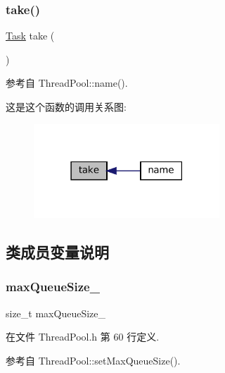\subsubsection{\texorpdfstring{take()}{take()}}
{\footnotesize\ttfamily \hyperlink{classmuduo_1_1ThreadPool_a46c264006febdf6c5dae5921d59c18d2}{Task} take (\begin{DoxyParamCaption}{ }\end{DoxyParamCaption})\hspace{0.3cm}{\ttfamily [private]}}



参考自 Thread\+Pool\+::name().

这是这个函数的调用关系图\+:
\nopagebreak
\begin{figure}[H]
\begin{center}
\leavevmode
\includegraphics[width=198pt]{classmuduo_1_1ThreadPool_a3a83b91742d92c2ed7cc4c56b61912f0_icgraph}
\end{center}
\end{figure}


\subsection{类成员变量说明}
\mbox{\label{classmuduo_1_1ThreadPool_abb3d9b1dbeac8214e3506703261d8280}} 
\subsubsection{\texorpdfstring{max\+Queue\+Size\+\_\+}{maxQueueSize\_}}
{\footnotesize\ttfamily size\+\_\+t max\+Queue\+Size\+\_\+\hspace{0.3cm}{\ttfamily [private]}}



在文件 Thread\+Pool.\+h 第 60 行定义.



参考自 Thread\+Pool\+::set\+Max\+Queue\+Size().

